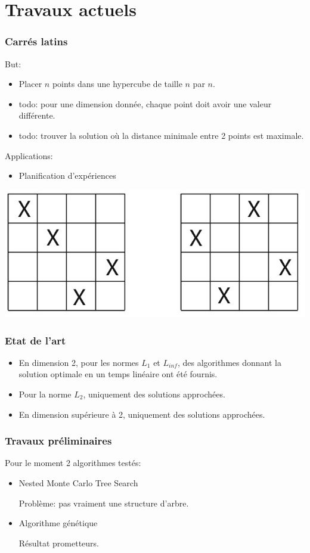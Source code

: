 \documentclass{beamer}
\begin{document}
\section{Travaux actuels}

\begin{frame}
    \frametitle{Carrés latins}
    But:
    \begin{itemize}
        \item Placer $n$ points dans une hypercube de taille $n$ par $n$.
        \item todo: pour une dimension donnée, chaque point doit avoir une valeur différente.
        \item todo: trouver la solution où la distance minimale entre 2 points est maximale.
    \end{itemize}
    Applications:
    \begin{itemize}
        \item Planification d'expériences
    \end{itemize}
    \begin{center}
        \includegraphics[scale=0.3]{LHS.jpg}
    \end{center}

\end{frame}

\begin{frame}
    \frametitle{Etat de l'art}
    \begin{itemize}
    \item En dimension 2, pour les normes $L_1$ et $L_{inf}$, des algorithmes donnant la solution optimale en un temps linéaire ont été fournis.
    \item Pour la norme $L_2$, uniquement des solutions approchées.
    \item En dimension supérieure à 2, uniquement des solutions approchées.
    \end{itemize}
\end{frame}

\begin{frame}
    \frametitle{Travaux préliminaires}
    Pour le moment 2 algorithmes testés:
    \begin{itemize}
        \item Nested Monte Carlo Tree Search

        Problème: pas vraiment une structure d'arbre.
        \item Algorithme génétique

        Résultat prometteurs.
    \end{itemize}
\end{frame}
\end{document}
